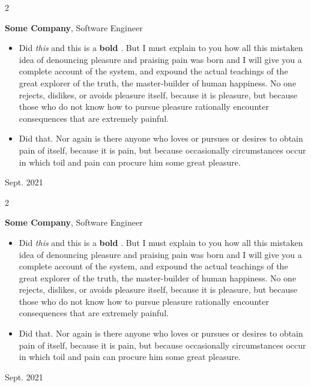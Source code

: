 \documentclass[10pt, letterpaper]{article}
\newenvironment{highlights}{
    \begin{itemize}[
        topsep=0.10 cm,
        parsep=0.10 cm,
        partopsep=0pt,
        itemsep=0pt,
        leftmargin=0.4 cm + 10pt
    ]
}{
    \end{itemize}
} %
\newenvironment{twocolentry}[2][]{
    \onecolentry
    \def\secondColumn{#2}
    \setcolumnwidth{\fill, 4.5 cm}
    \begin{paracol}{2}
}{
    \switchcolumn \raggedleft \secondColumn
    \end{paracol}
    \endonecolentry
} %
\let\hrefWithoutArrow\href
\renewcommand{\href}[2]{\hrefWithoutArrow{#1}{\mbox{\ifthenelse{\equal{#2}{}}{ }{#2 }\raisebox{.15ex}{\footnotesize \faExternalLink*}}}}
\begin{document}
        \vspace{0.2 cm}

        \begin{twocolentry}{
            Sept. 2021
        }
            \textbf{Some \textnormal{Company}}, Software Engineer
            \begin{highlights}
                \item Did \textit{this} and this is a \textbf{bold} \href{https://example.com}{link}. But I must explain to you how all this mistaken idea of denouncing pleasure and praising pain was born and I will give you a complete account of the system, and expound the actual teachings of the great explorer of the truth, the master-builder of human happiness. No one rejects, dislikes, or avoids pleasure itself, because it is pleasure, but because those who do not know how to pursue pleasure rationally encounter consequences that are extremely painful.
                \item Did that. Nor again is there anyone who loves or pursues or desires to obtain pain of itself, because it is pain, but because occasionally circumstances occur in which toil and pain can procure him some great pleasure.
            \end{highlights}
        \end{twocolentry}


        \vspace{0.2 cm}

        \begin{twocolentry}{
            Sept. 2021
        }
            \textbf{Some \textnormal{Company}}, Software Engineer
            \begin{highlights}
                \item Did \textit{this} and this is a \textbf{bold} \href{https://example.com}{link}. But I must explain to you how all this mistaken idea of denouncing pleasure and praising pain was born and I will give you a complete account of the system, and expound the actual teachings of the great explorer of the truth, the master-builder of human happiness. No one rejects, dislikes, or avoids pleasure itself, because it is pleasure, but because those who do not know how to pursue pleasure rationally encounter consequences that are extremely painful.
                \item Did that. Nor again is there anyone who loves or pursues or desires to obtain pain of itself, because it is pain, but because occasionally circumstances occur in which toil and pain can procure him some great pleasure.
            \end{highlights}
        \end{twocolentry}
\end{document}
